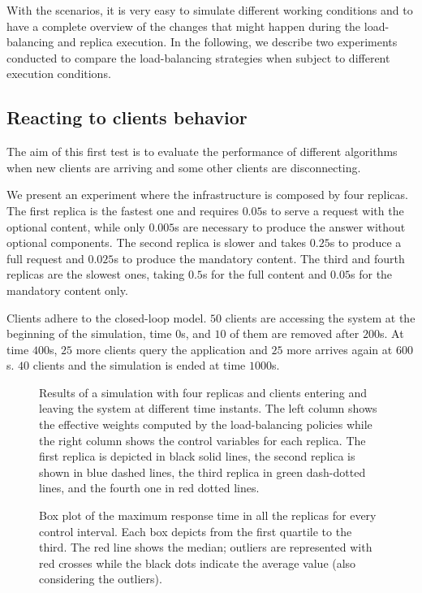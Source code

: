 With the scenarios, it is very easy to simulate different working
conditions and to have a complete overview of the changes that might
happen during the load-balancing and replica execution. In the
following, we describe two experiments conducted to compare the
load-balancing strategies when subject to different execution
conditions.

\subsection{Reacting to clients behavior}

The aim of this first test is to evaluate the performance of different
algorithms when new clients are arriving and some other clients are
disconnecting.

We present an experiment where the infrastructure is composed by four
replicas. The first replica is the fastest one and requires $0.05$s to
serve a request with the optional content, while only $0.005$s are
necessary to produce the answer without optional components. The
second replica is slower and takes $0.25$s to produce a full request
and $0.025$s to produce the mandatory content. The third and fourth
replicas are the slowest ones, taking $0.5$s for the full content and
$0.05$s for the mandatory content only.

Clients adhere to the closed-loop model. $50$ clients are accessing
the system at the beginning of the simulation, time $0$s, and $10$ of
them are removed after $200$s. At time $400$s, $25$ more clients query
the application and $25$ more arrives again at $600$s.  $40$ clients
and the simulation is ended at time $1000$s.

\begin{figure}
  \centering 
  \caption{Results of a simulation with four replicas and clients
    entering and leaving the system at different time instants. The
    left column shows the effective weights computed by the
    load-balancing policies while the right column shows the control
    variables for each replica. The first replica is depicted in black
    solid lines, the second replica is shown in blue dashed lines, the
    third replica in green dash-dotted lines, and the fourth one in
    red dotted lines.}
\label{fig:clientchanges-full}
\end{figure}

\begin{figure}
\centering

\vspace{-4mm}
\caption{Box plot of the maximum response time in all the replicas for
  every control interval. Each box depicts from the first quartile to
  the third. The red line shows the median; outliers are represented
  with red crosses while the black dots indicate the average value
  (also considering the outliers).}
\label{fig:clientchanges-boxplot}
\end{figure}

